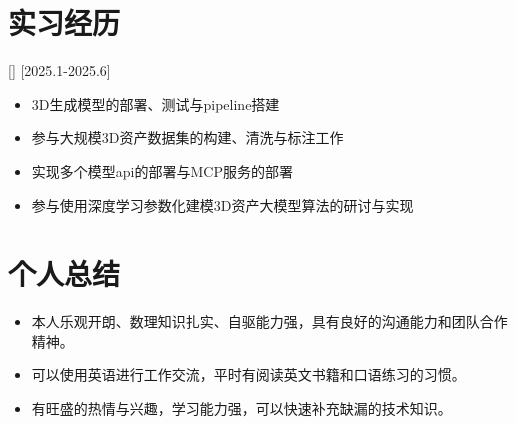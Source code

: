 \documentclass{resume}
\begin{document}
\section{实习经历}
[]
[2025.1-2025.6]
\begin{itemize}
  \item 3D生成模型的部署、测试与pipeline搭建
  \item 参与大规模3D资产数据集的构建、清洗与标注工作
  \item 实现多个模型api的部署与MCP服务的部署
  \item 参与使用深度学习参数化建模3D资产大模型算法的研讨与实现
\end{itemize}


\section{个人总结}

\begin{itemize}
  \item 本人乐观开朗、数理知识扎实、自驱能力强，具有良好的沟通能力和团队合作精神。
  \item 可以使用英语进行工作交流，平时有阅读英文书籍和口语练习的习惯。
  \item 有旺盛的热情与兴趣，学习能力强，可以快速补充缺漏的技术知识。
\end{itemize}
\end{document}
